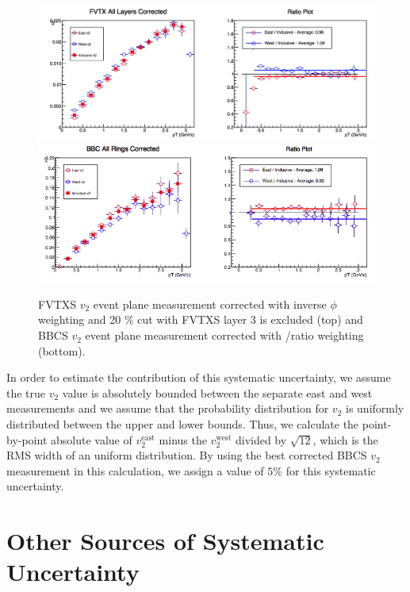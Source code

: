 \begin{figure}[!h]
\begin{center}
\includegraphics[width=0.75\linewidth]{figs/fvtx_corrected.png}
\includegraphics[width=0.75\linewidth]{figs/bbc_pp_correction.png}
\caption{ FVTXS $v_2$ event plane measurement corrected with inverse $\phi$ weighting and 20 $\%$ cut with FVTXS layer 3 is excluded (top) and BBCS $v_2$ event plane measurement corrected with \pp/\pau ratio weighting (bottom).}
\label{fig:fvtx_corrected_best}
\end{center}
\end{figure}

In order to estimate the contribution of this systematic uncertainty, we assume the true $v_2$ value is absolutely bounded between the separate east and west measurements and we assume that the probability distribution for $v_2$ is uniformly distributed between the upper and lower bounds. Thus, we calculate the point-by-point absolute value of $v_2^{\textrm{east}}$ minus the $v_2^{\textrm{west}}$ divided by $\sqrt{12}$, which is the RMS width of an uniform distribution. By using the best corrected BBCS $v_2$ measurement in this calculation, we assign a value of $5\%$ for this systematic uncertainty.


\section{Other Sources of Systematic Uncertainty}
